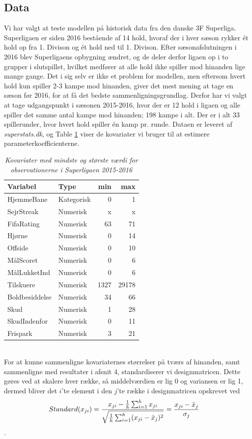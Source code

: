 \documentclass[11pt,a4paper]{article}
\begin{document}
\subsection{Data}
Vi har valgt at teste modellen på historisk data fra den danske 3F Superliga. Superligaen er siden 2016 bestående af 14 hold, hvoraf der i hver sæson rykker ét hold op fra 1. Divison og ét hold ned til 1. Divison. Efter sæsonafslutningen i 2016 blev Superligaens opbygning ændret, og de deler derfor ligaen op i to grupper i slutspillet, hvilket medfører at alle hold ikke spiller mod hinanden lige mange gange. Det i sig selv er ikke et problem for modellen, men eftersom hvert hold kun spiller 2-3 kampe mod hinanden, giver det mest mening at tage en sæson før 2016, for at få det bedste sammenligningsgrundlag. Derfor har vi valgt at tage udgangspunkt i sæsonen 2015-2016, hvor der er 12 hold i ligaen og alle spiller det samme antal kampe mod hinanden; 198 kampe i alt. Der er i alt 33 spillerunder, hvor hvert hold spiller én kamp pr. runde. Dataen er leveret af \textit{superstats.dk}, og Table \ref{tab:Kovariater} viser de kovariater vi bruger til at estimere parameterkoefficienterne.
\begin{table}[ht]
\centering
\begin{adjustbox}{max width=\textwidth}
\begin{tabular}{|l|lrr|}
  \hline
Variabel & Type & min & max \\ 
  \hline
HjemmeBane & Kategorisk & 0 & 1\\
SejrStreak & Numerisk & x & x\\
FifaRating & Numerisk & 63 & 71\\
Hjørne & Numerisk & 0 & 14\\
Offside & Numerisk & 0 & 10\\
MålScoret & Numerisk & 0 & 6\\
MålLukketInd & Numerisk & 0 & 6\\
Tilskuere & Numerisk & 1327 & 29178\\
Boldbesiddelse & Numerisk & 34 & 66\\
Skud & Numerisk & 1 & 28\\
SkudIndenfor & Numerisk & 0 & 11\\
Frispark & Numerisk & 3 & 21 \\
   \hline
\end{tabular}
\end{adjustbox}
\caption{\label{tab:Kovariater}\textit{Kovariater med mindste og største værdi for observationerne i Superligaen 2015-2016}}
\end{table}
\\For at kunne sammenligne kovariaternes størrelser på tværs af hinanden, samt sammenligne med resultater i afsnit 4, standardiserer vi designmatricen. Dette gøres ved at skalere hver række, så middelværdien er lig 0 og variansen er lig 1, dermed bliver det $i$'te element i den $j$'te række i designmatricen opskrevet ved
\begin{align*}
    Standard(x_{ji}) &= \frac{x_{ji}-\frac{1}{h}\sum_{i=1}^h{x_{ji}}}{\sqrt{\frac{1}{h}\sum_{i=1}^h(x_{ji}-\Bar{x}_j)^2}}=\frac{x_{ji}-\Bar{x}_j}{\sigma_j}
\end{align*}.
  
\end{document}

